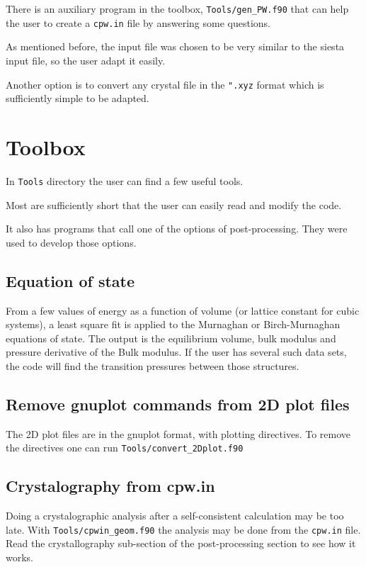 \documentclass[11pt]{article}
\begin{document}
There is an auxiliary program in the toolbox, \texttt{Tools/gen\_PW.f90}
that can help the user to create a \texttt{cpw.in} file by answering some questions.

As mentioned before, the input file was chosen to be very similar to the
{\sc siesta} input file, so the user adapt it easily.

Another option is to convert any crystal file in the \texttt{".xyz} format
which is sufficiently simple to be adapted.

\section{Toolbox}

In \texttt{Tools} directory the user can find a few useful tools.

Most are sufficiently short that the user can easily read and modify the code.

It also has programs that call one of the options of post-processing.
They were used to develop those options.

\subsection{Equation of state}

From a few values of energy as a function of volume (or lattice constant for cubic systems),
a least square fit is applied to the Murnaghan or Birch-Murnaghan equations of
state.  The output is the equilibrium volume, bulk modulus and pressure derivative
of the Bulk modulus.  If the user has several such data sets,
the code will find the transition pressures between those structures.

\subsection{Remove gnuplot commands from 2D plot files}

The 2D plot files are in the gnuplot format, with plotting directives.  To remove the
directives one can run \texttt{Tools/convert\_2Dplot.f90}

\subsection{Crystalography from cpw.in}

Doing a crystalographic analysis after a self-consistent calculation
may be too late.  With \texttt{Tools/cpwin\_geom.f90}
the analysis may be done from the \texttt{cpw.in} file.
Read the crystallography sub-section of the post-processing section
to see how it works.
\end{document}
